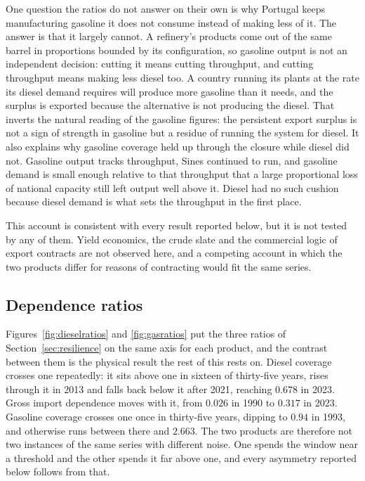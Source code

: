 \documentclass[11pt,a4paper]{article}
\begin{document}
One question the ratios do not answer on their own is why Portugal keeps manufacturing gasoline
it does not consume instead of making less of it. The answer is that it largely cannot. A
refinery's products come out of the same barrel in proportions bounded by its configuration, so
gasoline output is not an independent decision: cutting it means cutting throughput, and cutting
throughput means making less diesel too. A country running its plants at the rate its diesel
demand requires will produce more gasoline than it needs, and the surplus is exported because
the alternative is not producing the diesel. That inverts the natural reading of the gasoline
figures: the persistent export surplus is not a sign of strength in gasoline but a residue of
running the system for diesel. It also explains why gasoline coverage held up through the
closure while diesel did not. Gasoline output tracks throughput, Sines continued to run, and
gasoline demand is small enough relative to that throughput that a large proportional loss of
national capacity still left output well above it. Diesel had no such cushion because diesel
demand is what sets the throughput in the first place.

This account is consistent with every result reported below, but it is not tested by any of
them. Yield economics, the crude slate and the commercial logic of export contracts are not
observed here, and a competing account in which the two products differ for reasons of
contracting would fit the same series.

\subsection{Dependence ratios}

Figures~\ref{fig:dieselratios} and \ref{fig:gasratios} put the three ratios of
Section~\ref{sec:resilience} on the same axis for each product, and the contrast between them is
the physical result the rest of this rests on. Diesel coverage crosses one repeatedly: it sits
above one in sixteen of thirty-five years, rises through it in 2013 and falls back below it
after 2021, reaching $0.678$ in 2023. Gross import dependence moves with it, from $0.026$ in
1990 to $0.317$ in 2023. Gasoline coverage crosses one once in thirty-five years, dipping to
$0.94$ in 1993, and otherwise runs between there and $2.663$. The two products are therefore not
two instances of the same series with different noise. One spends the window near a threshold
and the other spends it far above one, and every asymmetry reported below follows from that.
\end{document}
